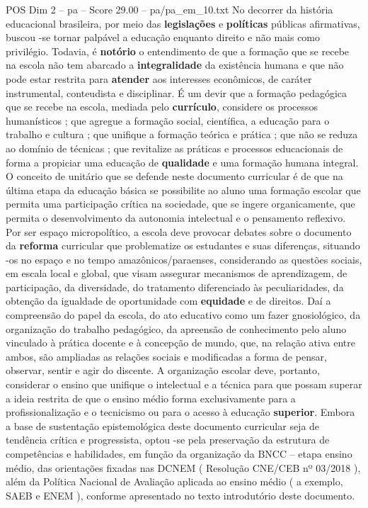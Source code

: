 \begin{textsample}{POS Dim 2 – pa – Score 29.00 – pa/pa\_em\_10.txt}
No decorrer da história educacional brasileira, por meio das \textbf{legislações} e \textbf{políticas} públicas afirmativas, buscou -se tornar palpável a educação enquanto direito e não mais como privilégio.
Todavia, é \textbf{notório} o entendimento de que a formação que se recebe na escola não tem abarcado a \textbf{integralidade} da existência humana e que não pode estar restrita para \textbf{atender} aos interesses econômicos, de caráter instrumental, conteudista e disciplinar.
É um devir que a formação pedagógica que se recebe na escola, mediada pelo \textbf{currículo}, considere os processos humanísticos ; que agregue a formação social, científica, a educação para o trabalho e cultura ; que unifique a formação teórica e prática ; que não se reduza ao domínio de técnicas ; que revitalize as práticas e processos educacionais de forma a propiciar uma educação de \textbf{qualidade} e uma formação humana integral.
O conceito de unitário que se defende neste documento curricular é de que na última etapa da educação básica se possibilite ao aluno uma formação escolar que permita uma participação crítica na sociedade, que se ingere organicamente, que permita o desenvolvimento da autonomia intelectual e o pensamento reflexivo.
Por ser espaço micropolítico, a escola deve provocar debates sobre o documento da \textbf{reforma} curricular que problematize os estudantes e suas diferenças, situando -os no espaço e no tempo amazônicos/paraenses, considerando as questões sociais, em escala local e global, que visam assegurar mecanismos de aprendizagem, de participação, da diversidade, do tratamento diferenciado às peculiaridades, da obtenção da igualdade de oportunidade com \textbf{equidade} e de direitos.
Daí a compreensão do papel da escola, do ato educativo como um fazer gnosiológico, da organização do trabalho pedagógico, da apreensão de conhecimento pelo aluno vinculado à prática docente e à concepção de mundo, que, na relação ativa entre ambos, são ampliadas as relações sociais e modificadas a forma de pensar, observar, sentir e agir do discente.
A organização escolar deve, portanto, considerar o ensino que unifique o intelectual e a técnica para que possam superar a ideia restrita de que o ensino médio forma exclusivamente para a profissionalização e o tecnicismo ou para o acesso à educação \textbf{superior}.
Embora a base de sustentação epistemológica deste documento curricular seja de tendência crítica e progressista, optou -se pela preservação da estrutura de competências e habilidades, em função da organização da BNCC – etapa ensino médio, das orientações fixadas nas DCNEM ( Resolução CNE/CEB nº 03/2018 ), além da Política Nacional de Avaliação aplicada ao ensino médio ( a exemplo, SAEB e ENEM ), conforme apresentado no texto introdutório deste documento.

\end{textsample}

